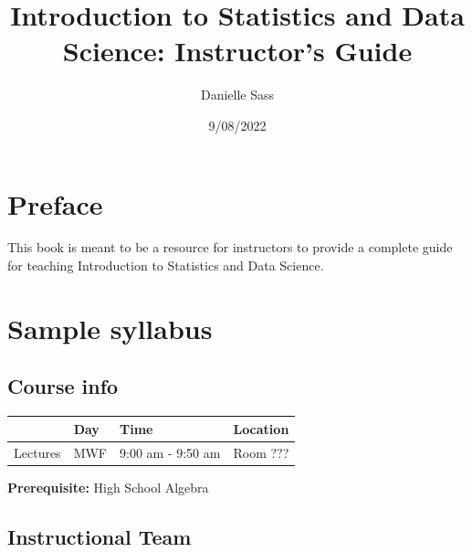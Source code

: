 \documentclass[
  letterpaper,
  DIV=11,
  numbers=noendperiod]{scrreprt}
\title{Introduction to Statistics and Data Science: Instructor's Guide}
\author{Danielle Sass}
\date{9/08/2022}
\renewcommand*\contentsname{Table of contents}
\newcommand\contentsname{Table of contents}
\begin{document}
\maketitle
\ifdefined\Shaded\renewenvironment{Shaded}{\begin{tcolorbox}[boxrule=0pt, sharp corners, interior hidden, borderline west={3pt}{0pt}{shadecolor}, enhanced, breakable, frame hidden]}{\end{tcolorbox}}\fi

\renewcommand*\contentsname{Table of contents}
{
\hypersetup{linkcolor=}
\setcounter{tocdepth}{1}
\tableofcontents
}

\hypertarget{preface}{%
\chapter*{Preface}\label{preface}}

This book is meant to be a resource for instructors to provide a
complete guide for teaching Introduction to Statistics and Data Science.


\hypertarget{sample-syllabus}{%
\chapter*{Sample syllabus}\label{sample-syllabus}}

\hypertarget{course-info}{%
\section*{Course info}\label{course-info}}

\begin{longtable}[]{@{}llll@{}}
\toprule()
& Day & Time & Location \\
\midrule()
\endhead
Lectures & MWF & 9:00 am - 9:50 am & Room ??? \\
\bottomrule()
\end{longtable}

\textbf{Prerequisite:} High School Algebra

\hypertarget{instructional-team}{%
\section*{Instructional Team}\label{instructional-team}}
\end{document}

